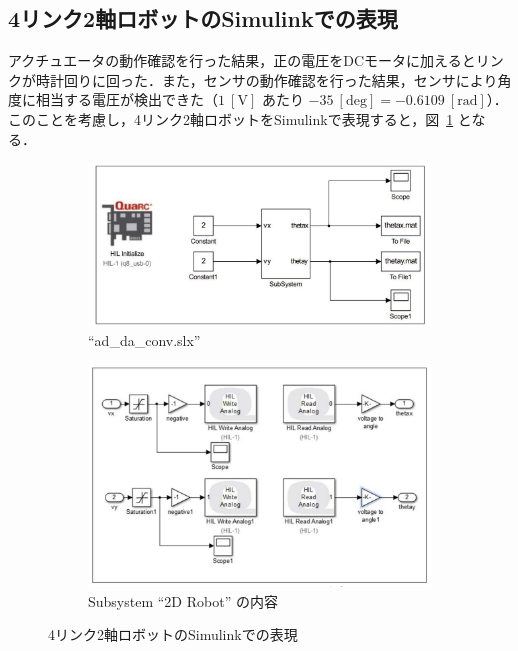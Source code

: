 \subsection{4リンク2軸ロボットのSimulinkでの表現}

アクチュエータの動作確認を行った結果，正の電圧をDCモータに加えるとリンクが時計回りに回った．また，センサの動作確認を行った結果，センサにより角度に相当する電圧が検出できた（$1~[\mathrm{V}]$ あたり $-35~[\mathrm{deg}] = -0.6109~[\mathrm{rad}]$）．このことを考慮し，4リンク2軸ロボットをSimulinkで表現すると，図~\ref{fig:simulink_model_4link2joint} となる．

\begin{figure}[htbp]
    \centering
    \begin{subfigure}[b]{0.8\linewidth}
        \centering
        \includegraphics[width=\linewidth]{figure/ad_da_conv.pdf}
        \caption{``ad\_da\_conv.slx''}
    \end{subfigure}
    \vspace{1em}
    \begin{subfigure}[b]{0.8\linewidth}
        \centering
        \includegraphics[width=\linewidth]{figure/subsystem_2drobot.pdf}
        \caption{Subsystem ``2D Robot'' の内容}
    \end{subfigure}
    \caption{4リンク2軸ロボットのSimulinkでの表現}
    \label{fig:simulink_model_4link2joint}
\end{figure}

